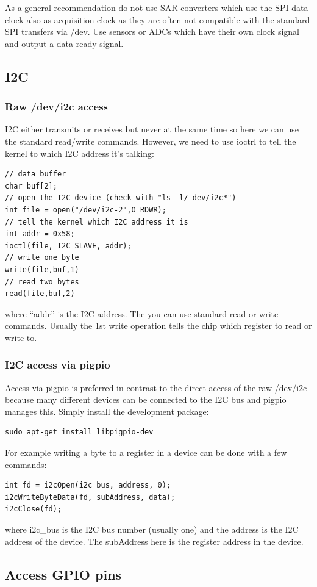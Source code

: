 \documentclass[12pt]{article}
\begin{document}
As a general recommendation do not use SAR converters which use the
SPI data clock also as acquisition clock as they are often not compatible
with the standard SPI transfers via /dev. Use sensors or ADCs which
have their own clock signal and output a data-ready signal.


\subsection{I2C}
\subsubsection{Raw /dev/i2c access}
I2C either transmits or receives but never at the same time so here we
can use the standard read/write commands. However, we need to use ioctrl to tell
the kernel to which I2C address it's talking:
\begin{verbatim}
// data buffer
char buf[2];
// open the I2C device (check with "ls -l/ dev/i2c*")
int file = open("/dev/i2c-2",O_RDWR);
// tell the kernel which I2C address it is
int addr = 0x58;
ioctl(file, I2C_SLAVE, addr);
// write one byte
write(file,buf,1)
// read two bytes
read(file,buf,2)
\end{verbatim}
where ``addr'' is the I2C address. The you can use standard read
or write commands. Usually the 1st write operation tells the chip
which register to read or write to.

\subsubsection{I2C access via pigpio}
Access via pigpio is preferred in contrast to the direct
access of the raw /dev/i2c because many different devices
can be connected to the I2C bus and pigpio manages this.
Simply install the development package:
\begin{verbatim}
sudo apt-get install libpigpio-dev
\end{verbatim}
For example writing a byte to a register in a device can be done with a
few commands:
\begin{verbatim}
int fd = i2cOpen(i2c_bus, address, 0);
i2cWriteByteData(fd, subAddress, data);
i2cClose(fd);
\end{verbatim}
where i2c\_bus is the I2C bus number (usually one)
and the address is the I2C address of the device.
The subAddress here is the register address in the device.

\subsection{Access GPIO pins}
\end{document}
